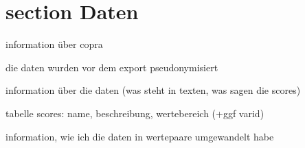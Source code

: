 \section{section Daten}
information über copra %

die daten wurden vor dem export pseudonymisiert

information über die daten (was steht in texten, was sagen die scores)

tabelle scores: name, beschreibung, wertebereich (+ggf varid)


information, wie ich die daten in wertepaare umgewandelt habe